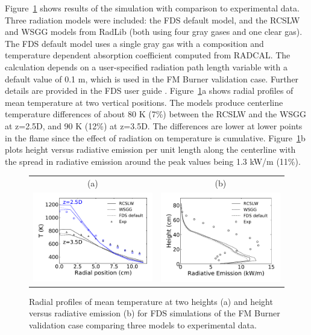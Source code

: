 \documentclass[preprint,12pt]{elsarticle}
\begin{document}
Figure~\ref{f:fds} shows results of the simulation with comparison to experimental data. Three radiation models were included: the FDS default model, and the RCSLW and WSGG models from RadLib (both using four gray gases and one clear gas).
The FDS default model uses a single gray gas with a composition and temperature dependent absorption coefficient computed from RADCAL. The calculation depends on a user-specified radiation path length variable with a default value of 0.1 m, which is used in the FM Burner validation case. Further details are provided in the FDS user guide \cite{FDS}. Figure~\ref{f:fds}a shows radial profiles of mean temperature at two vertical positions. The models produce centerline temperature differences of about 80 K (7\%) between the RCSLW and the WSGG at z=2.5D, and 90 K (12\%) at z=3.5D. The differences are lower at lower points in the flame since the effect of radiation on temperature is cumulative. Figure~\ref{f:fds}b plots height versus radiative emission per unit length along the centerline with the spread in radiative emission around the peak values being 1.3 kW/m (11\%).
%
\begin{figure}
\begin{center}
\begin{tabular}{c c}
(a) & (b) \\
\includegraphics[width=2.5 in]{fig_fds_T_mean.pdf} &
\includegraphics[width=2.5 in]{fig_fds_rad_mean.pdf}
\end{tabular}
\caption{Radial profiles of mean temperature at two heights (a) and height versus radiative emission (b) for FDS simulations of the FM Burner validation case comparing three models to experimental data.}
\label{f:fds}
\end{center}
\end{figure}
%
\end{document}
